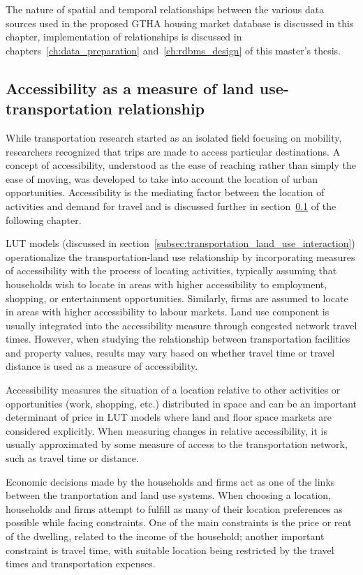The nature of spatial and temporal relationships between the various data sources used in the proposed GTHA housing market database is discussed in this chapter, implementation of relationships is discussed in chapters~\ref{ch:data_preparation} and~\ref{ch:rdbms_design} of this master's thesis.

\subsection{Accessibility as a measure of land use-transportation relationship} \label{subsec:accessibility}

While transportation research started as an isolated field focusing on mobility, researchers recognized that trips are made to access particular destinations\cite{VanLierop2017}.
A concept of accessibility, understood as the ease of reaching rather than simply the ease of moving\cite{Preston2007}, was developed to take into account the location of urban opportunities.
Accessibility is the mediating factor between the location of activities and demand for travel and is discussed further in section~\ref{subsec:accessibility} of the following chapter.

LUT models (discussed in section~\ref{subsec:transportation_land_use_interaction}) operationalize the transportation-land use relationship by incorporating measures of accessibility with the process of locating activities, typically assuming that households wish to locate in areas with higher accessibility to employment, shopping, or entertainment opportunities.
Similarly, firms are assumed to locate in areas with higher accessibility to labour markets.
Land use component is usually integrated into the accessibility measure through congested network travel times.
However, when studying the relationship between transportation facilities and property values, results may vary based on whether travel time or travel distance is used as a measure of accessibility\cite{Sherry1999}.

Accessibility measures the situation of a location relative to other activities or opportunities (work, shopping, etc.) distributed in space and can be an important determinant of price in LUT models where land and floor space markets are considered explicitly\cite{Iacono2008}.
When measuring changes in relative accessibility, it is usually approximated by some measure of access to the transportation network, such as travel time or distance.

Economic decisions made by the households and firms act as one of the links between the tranportation and land use systems.
When choosing a location, households and firms attempt to fulfill as many of their location preferences as possible while facing constraints.
One of the main constraints is the price or rent of the dwelling, related to the income of the household;
another important constraint is travel time, with suitable location being restricted by the travel times and transportation expenses\cite{Moeckel2017}.

